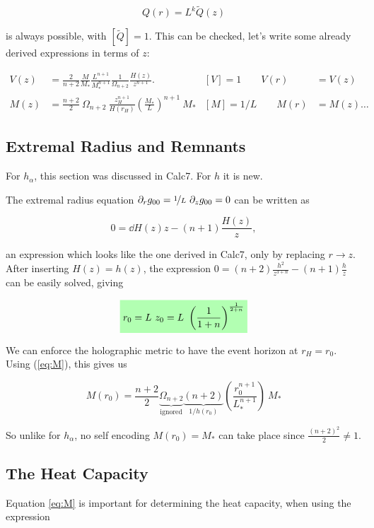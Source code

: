 \documentclass[10pt,a4paper, fleqn]{article}
\newcommand{\highlight}[1]{%
  \colorbox{green!30}{$\displaystyle#1$}}
\begin{document}
\begin{equation}
Q(r) = L^k \tilde{Q}(z)
\end{equation}

is always possible, with $[\tilde Q] = 1$. This can be checked, let's write some already derived expressions in terms of $z$:

\begin{align}
V(z) &= \frac{2}{n+2} \frac{M}{M_*} \frac{L^{n+1}}{M_*^{n+1}} \frac 1{\Omega_{n+2}} \frac{H(z)}{z^{n+1}}. 
&[V]=1  \quad\quad V(r)&=V(z) \\
M(z) &= \frac{n+2}{2} ~\Omega_{n+2}~ \frac{z_H^{n+1}}{H(r_H)} \left( \frac{M_*}{L} \right)^{n+1} ~M_* 
&[M]=1/L \quad\quad  M(r)&=M(z) \dots
\end{align}

\subsection{Extremal Radius and Remnants}
For $h_\alpha$, this section was discussed in Calc7. For $h$ it is new.

The extremal radius equation $\partial_r g_{00} = \nicefrac 1L~\partial_z g_{00} = 0$ can be written as

\begin{equation}
0 =  \dd{H(z)}{z} - (n+1) \frac{H(z)}{z},
\end{equation}

an expression which looks like the one derived in Calc7, only by replacing $r\to z$. After inserting $H(z)=h(z)$, the expression $
0 = (n+2) \frac{h^2}{z^{3+n}} - (n+1) \frac{h}{z}$ can be easily solved, giving

\begin{equation}
\highlight{ r_0 = L~z_0 = L~\left(\frac{1}{1+n}\right)^{\frac{1}{2+n}} }
\end{equation}

We can enforce the holographic metric to have the event horizon at $r_H=r_0$. Using (\ref{eq:M}), this gives us

\begin{equation}
M(r_0) = \frac{n+2}2 \underbrace{\Omega_{n+2}}_\text{ignored} \underbrace{(n+2)}_{1/h(r_0)} \left(\frac{r_0^{n+1}}{L_*^{n+1}} \right)~M_*
\end{equation}

So unlike for $h_\alpha$, no self encoding $M(r_0)=M_*$ can take place since $\frac{(n+2)^2}2 \neq 1$.


\subsection{The Heat Capacity}
Equation \ref{eq:M} is important for determining the heat capacity, when using the expression
\end{document}
